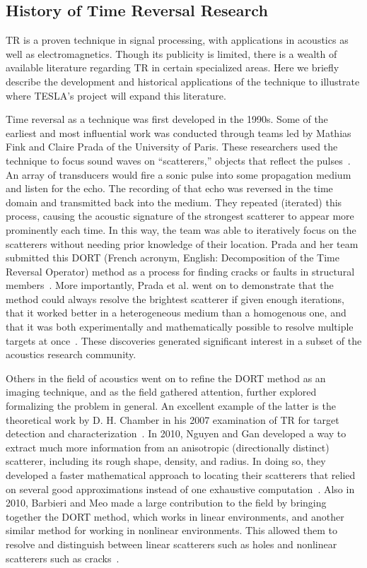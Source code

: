 \subsection{History of Time Reversal Research}

TR is a proven technique in signal processing, with applications in acoustics as well as electromagnetics. Though its publicity is limited, there is a wealth of available literature regarding TR in certain specialized areas. Here we briefly describe the development and historical applications of the technique to illustrate where TESLA's project will expand this literature.

Time reversal as a technique was first developed in the 1990s. Some of the earliest and most influential work was conducted through teams led by Mathias Fink and Claire Prada of the University of Paris. These researchers used the technique to focus sound waves on ``scatterers,'' objects that reflect the pulses~\cite{prada_iterative_1991}. An array of transducers would fire a sonic pulse into some propagation medium and listen for the echo. The recording of that echo was reversed in the time domain and transmitted back into the medium. They repeated (iterated) this process, causing the acoustic signature of the strongest scatterer to appear more prominently each time. In this way, the team was able to iteratively focus on the scatterers without needing prior knowledge of their location. Prada and her team submitted this DORT (French acronym, English: Decomposition of the Time Reversal Operator) method as a process for finding cracks or faults in structural members~\cite{prada_iterative_1991}. More importantly, Prada et al. went on to demonstrate that the method could always resolve the brightest scatterer if given enough iterations, that it worked better in a heterogeneous medium than a homogenous one, and that it was both experimentally and mathematically possible to resolve multiple targets at once~\cite{prada_decomposition_1996}. These discoveries generated significant interest in a subset of the acoustics research community.

Others in the field of acoustics went on to refine the DORT method as an imaging technique, and as the field gathered attention, further explored formalizing the problem in general. An excellent example of the latter is the theoretical work by D. H. Chamber in his 2007 examination of TR for target detection and characterization~\cite{chambers_target_2007}. In 2010, Nguyen and Gan developed a way to extract much more information from an anisotropic (directionally distinct) scatterer, including its rough shape, density, and radius. In doing so, they developed a faster mathematical approach to locating their scatterers that relied on several good approximations instead of one exhaustive computation~\cite{nguyen_dort_2010}. Also in 2010, Barbieri and Meo made a large contribution to the field by bringing together the DORT method, which works in linear environments, and another similar method for working in nonlinear environments. This allowed them to resolve and distinguish between linear scatterers such as holes and nonlinear scatterers such as cracks~\cite{barbieri_time_2010}.

